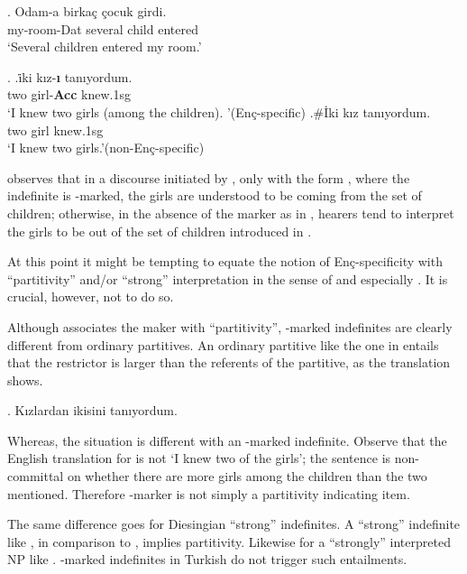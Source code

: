 \documentclass[11pt,a4paper]{article}
\newcommand{\encspec}{Enç-specific}
\begin{document}
\exg.\label{exencintro}%
{Odam-a}  {birka\c{c}} {\c{c}ocuk} {girdi.}\\
{my-room-Dat} {several}  {child}  {entered}\\
`Several children entered my room.'

\ex.\label{exenc}
\ag.\label{exenca}{\.iki}  {k\i{}z-\textbf{\i}} {tan\i{}yordum}.\\
{two}  {girl-{\bf Acc}}  {knew.1sg}\\
`I knew two girls (among the children). '\hfill (\encspec)
\bg.\label{exencz}\#{\.Iki}  {k\i{}z}  {tan\i{}yordum.} \\
{two}  {girl}  {knew.1sg}\\
`I knew two girls.'\hfill (non-\encspec)


 observes that in a discourse initiated by
, only with the form , where the
indefinite  is \acc-marked, the girls are
understood to be coming from the set of children; otherwise, in the
absence of the marker as in , hearers tend to interpret
the girls to be out of the set of children introduced in
. 

At this point it might be tempting to equate the notion of
\encspec ity with ``partitivity'' and/or ``strong'' interpretation in
the sense of \cite{milsark77} and especially \cite{diesing92}. It is
crucial, however, not to do so.

Although  associates the maker with ``partitivity'',
\acc-marked indefinites are clearly different from ordinary
partitives. An ordinary partitive like the one in 
entails that the restrictor is larger than the referents of the
partitive, as the translation shows.

\ex.\label{exordpart} Kızlardan ikisini tanıyordum.


Whereas, the situation is different with an \acc-marked indefinite.
Observe that the English translation for  is not `I knew
two of the girls'; the sentence is non-committal on whether there are
more girls among the children than the two mentioned.  Therefore
\acc-marker is not simply a partitivity indicating item.

The same difference goes for Diesingian ``strong'' indefinites. A
``strong'' indefinite like , in comparison to
, implies partitivity. Likewise for a ``strongly''
interpreted NP like . \acc-marked indefinites in
Turkish do not trigger such entailments.
\end{document}
